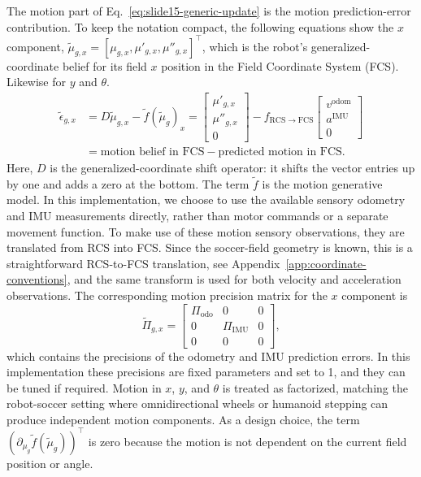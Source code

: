 The motion part of Eq.~\ref{eq:slide15-generic-update} is the motion prediction-error contribution.
To keep the notation compact, the following equations show the $x$ component, $\tilde{\mu}_{g,x}=[\mu_{g,x},\mu'_{g,x},\mu''_{g,x}]^\top$, which is the robot's generalized-coordinate belief for its field $x$ position in the Field Coordinate System (FCS). Likewise for $y$ and $\theta$.
\begin{align}
    \tilde{\epsilon}_{g,x}
    &=
    D\tilde{\mu}_{g,x}
    -
    \tilde{f}(\tilde{\mu}_g)_x
    =
    \begin{bmatrix}
        \mu'_{g,x} \\
        \mu''_{g,x} \\
        0
    \end{bmatrix}
    -
    f_{\mathrm{RCS}\rightarrow\mathrm{FCS}}
    \begin{bmatrix}
        v^{\mathrm{odom}} \\
        a^{\mathrm{IMU}} \\
        0
    \end{bmatrix}
    \nonumber \\
    &=
    \text{motion belief in FCS}
    -
    \text{predicted motion in FCS}.
    \label{eq:motion-error-x}
\end{align}
Here, $D$ is the generalized-coordinate shift operator: it shifts the vector entries up by one and adds a zero at the bottom.
The term $\tilde{f}$ is the motion generative model. In this implementation, we choose to use the available sensory odometry and IMU measurements directly, rather than motor commands or a separate movement function. To make use of these motion sensory observations, they are translated from RCS into FCS. Since the soccer-field geometry is known, this is a straightforward RCS-to-FCS translation, see Appendix~\ref{app:coordinate-conventions}, and the same transform is used for both velocity and acceleration observations.
The corresponding motion precision matrix for the $x$ component is
\begin{equation}
    \tilde{\Pi}_{g,x}
    =
    \begin{bmatrix}
        \Pi_{\mathrm{odo}} & 0 & 0 \\
        0 & \Pi_{\mathrm{IMU}} & 0 \\
        0 & 0 & 0
    \end{bmatrix},
    \label{eq:motion-precision-x}
\end{equation}
which contains the precisions of the odometry and IMU prediction errors. In this implementation these precisions are fixed parameters and set to 1, and they can be tuned if required. Motion in $x$, $y$, and $\theta$ is treated as factorized, matching the robot-soccer setting where omnidirectional wheels or humanoid stepping can produce independent motion components. As a design choice, the term $\left(\partial_{\mu_g}\tilde{f}(\tilde{\mu}_g)\right)^\top$ is zero because the motion is not dependent on the current field position or angle.


